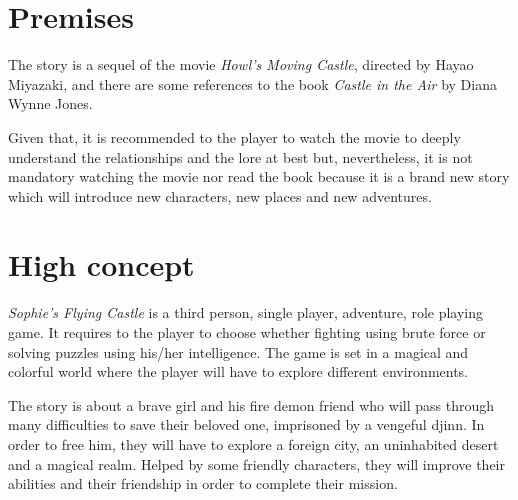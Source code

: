 \section{Premises}

The story is a sequel of the movie \textit{Howl’s Moving Castle}, directed by Hayao Miyazaki, and there are some references to the book \textit{Castle in the Air} by Diana Wynne Jones.

Given that, it is recommended to the player to watch the movie to deeply understand the relationships and the lore at best but, nevertheless, it is not mandatory watching the movie nor read the book because it is a brand new story which will introduce new characters, new places and new adventures.

\section{High concept}

\textit{Sophie's Flying Castle} is a third person, single player, adventure, role playing game. It requires to the player to choose whether fighting using brute force or solving puzzles using his/her intelligence. The game is set in a magical and colorful world where the player will have to explore different environments. 

The story is about a brave girl and his fire demon friend who will pass through many difficulties to save their beloved one, imprisoned by a vengeful djinn. In order to free him, they will have to explore a foreign city, an uninhabited desert and a magical realm. Helped by some friendly characters, they will improve their abilities and their friendship in order to complete their mission.
